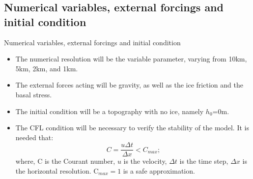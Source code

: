 \documentclass[11pt]{beamer}
\begin{document}
	\subsection{Numerical variables, external forcings and initial condition}
	\begin{frame}{Numerical variables, external forcings and initial condition}
		\begin{itemize}
			\item The numerical resolution will be the variable parameter, varying from 10km, 5km, 2km, and 1km.
			\pause \item The external forces acting will be gravity, as well as the ice friction and the basal stress.
			\pause \item The initial condition will be a topography with no ice, namely $h_0$=0m.
			\pause \item The CFL condition will be necessary to verify the stability of the model. It is needed that:
			\begin{equation}
				C=\frac{u\Delta t}{\Delta x}<C_{max};
			\end{equation}
			where, C is the Courant number, $u$ is the velocity, $\Delta t$ is the time step, $\Delta x$ is the horizontal resolution. C$_{max}=1$ is a safe approximation.  
		\end{itemize}
	\end{frame}
\end{document}
